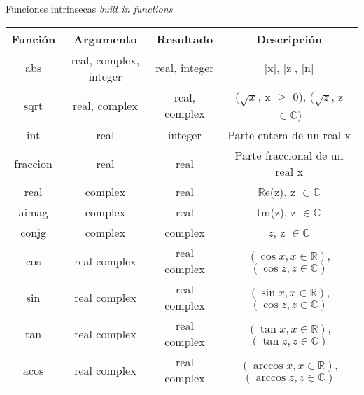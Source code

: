 \begin{frame}[fragile]{Funciones intrínsecas \textit{built in functions}}  
    \begin{table}[]
    \centering
    \label{Tabla_funcionesintr}
    \resizebox{10.5cm}{!} {
    \begin{tabular}{|c|c|c|c|}
    \hline
    Función         & Argumento                     & Resultado         & Descripción                                                       \\ \hline
    abs             & real, complex, integer        & real, integer     & |x|, |z|, |n|                                                     \\ \hline
    sqrt            & real, complex                 & real, complex     & ($\sqrt{x}$, x $\geq$ 0), ($\sqrt{z}$, z $\in \mathbb{C}$)        \\ \hline
    int             & real                          & integer           & Parte entera de un real x                                         \\ \hline
    fraccion        & real                          & real              & Parte fraccional de un real x                                     \\ \hline
    real            & complex                       & real              & $\mathbb{R}$e(z), z $\in \mathbb{C}$                              \\ \hline
    aimag           & complex                       & real              & $\mathbb{I}$m(z), z $\in \mathbb{C}$                              \\ \hline              
    conjg           & complex                       & complex           & $\bar{z}$, z $\in \mathbb{C}$                                     \\ \hline 
    cos             & real complex                  & real complex      & $(\cos x, x \in \mathbb{R})$, $(\cos z, z \in \mathbb{C})$        \\ \hline 
    sin             & real complex                  & real complex      & $(\sin x, x \in \mathbb{R})$, $(\cos z, z \in \mathbb{C})$        \\ \hline 
    tan             & real complex                  & real complex      & $(\tan x, x \in \mathbb{R})$, $(\tan z, z \in \mathbb{C})$        \\ \hline 
    acos            & real complex                  & real complex      & $(\arccos x, x \in \mathbb{R})$, $(\arccos z, z \in \mathbb{C})$  \\ \hline 

\end{tabular}}
\end{table}
\end{frame}
